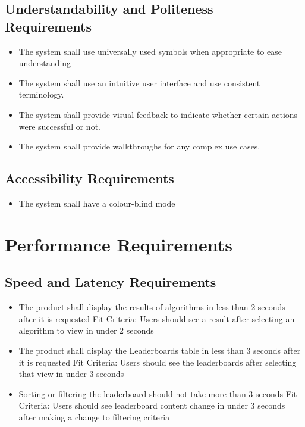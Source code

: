\documentclass[12pt]{article}
\begin{document}
\subsection{Understandability and Politeness Requirements}
\begin{itemize}
    \item The system shall use universally used symbols when appropriate to ease understanding
    \item The system shall use an intuitive user interface and use consistent terminology.
    \item The system shall provide visual feedback to indicate whether certain actions were successful or not.
    \item The system shall provide walkthroughs for any complex use cases.
\end{itemize}

\subsection{Accessibility Requirements}
\begin{itemize}
    \item The system shall have a colour-blind mode
\end{itemize}

\section{Performance Requirements}
\subsection{Speed and Latency Requirements}
\begin{itemize}
\item The product shall display the results of algorithms in less than 2 seconds after it is requested \hfill \break
Fit Criteria: Users should see a result after selecting an algorithm to view in under 2 seconds
\item The product shall display the Leaderboards table in less than 3 seconds after it is requested \hfill \break
Fit Criteria: Users should see the leaderboards after selecting that view in under 3 seconds
\item Sorting or filtering the leaderboard should not take more than 3 seconds \hfill \break
Fit Criteria: Users should see leaderboard content change in under 3 seconds after making a change to filtering criteria
\end{itemize}
\end{document}
